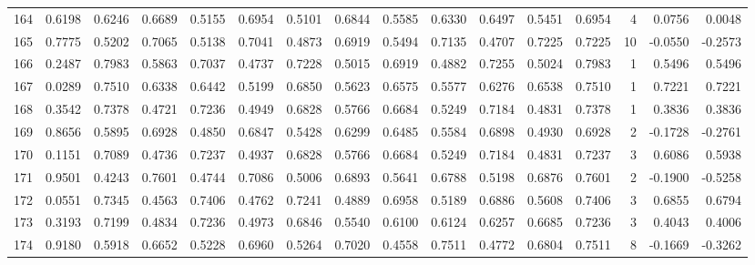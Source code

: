 \begin{tabular}{lrrrrrrrrrrrrrrr}
164 &      0.6198 &  0.6246 &  0.6689 &  0.5155 &  0.6954 &  0.5101 &  0.6844 &  0.5585 &  0.6330 &  0.6497 &   0.5451 &     0.6954 &      4 &                    0.0756 &                     0.0048 \\
165 &      0.7775 &  0.5202 &  0.7065 &  0.5138 &  0.7041 &  0.4873 &  0.6919 &  0.5494 &  0.7135 &  0.4707 &   0.7225 &     0.7225 &     10 &                   -0.0550 &                    -0.2573 \\
166 &      0.2487 &  0.7983 &  0.5863 &  0.7037 &  0.4737 &  0.7228 &  0.5015 &  0.6919 &  0.4882 &  0.7255 &   0.5024 &     0.7983 &      1 &                    0.5496 &                     0.5496 \\
167 &      0.0289 &  0.7510 &  0.6338 &  0.6442 &  0.5199 &  0.6850 &  0.5623 &  0.6575 &  0.5577 &  0.6276 &   0.6538 &     0.7510 &      1 &                    0.7221 &                     0.7221 \\
168 &      0.3542 &  0.7378 &  0.4721 &  0.7236 &  0.4949 &  0.6828 &  0.5766 &  0.6684 &  0.5249 &  0.7184 &   0.4831 &     0.7378 &      1 &                    0.3836 &                     0.3836 \\
169 &      0.8656 &  0.5895 &  0.6928 &  0.4850 &  0.6847 &  0.5428 &  0.6299 &  0.6485 &  0.5584 &  0.6898 &   0.4930 &     0.6928 &      2 &                   -0.1728 &                    -0.2761 \\
170 &      0.1151 &  0.7089 &  0.4736 &  0.7237 &  0.4937 &  0.6828 &  0.5766 &  0.6684 &  0.5249 &  0.7184 &   0.4831 &     0.7237 &      3 &                    0.6086 &                     0.5938 \\
171 &      0.9501 &  0.4243 &  0.7601 &  0.4744 &  0.7086 &  0.5006 &  0.6893 &  0.5641 &  0.6788 &  0.5198 &   0.6876 &     0.7601 &      2 &                   -0.1900 &                    -0.5258 \\
172 &      0.0551 &  0.7345 &  0.4563 &  0.7406 &  0.4762 &  0.7241 &  0.4889 &  0.6958 &  0.5189 &  0.6886 &   0.5608 &     0.7406 &      3 &                    0.6855 &                     0.6794 \\
173 &      0.3193 &  0.7199 &  0.4834 &  0.7236 &  0.4973 &  0.6846 &  0.5540 &  0.6100 &  0.6124 &  0.6257 &   0.6685 &     0.7236 &      3 &                    0.4043 &                     0.4006 \\
174 &      0.9180 &  0.5918 &  0.6652 &  0.5228 &  0.6960 &  0.5264 &  0.7020 &  0.4558 &  0.7511 &  0.4772 &   0.6804 &     0.7511 &      8 &                   -0.1669 &                    -0.3262 \\

\end{tabular}
